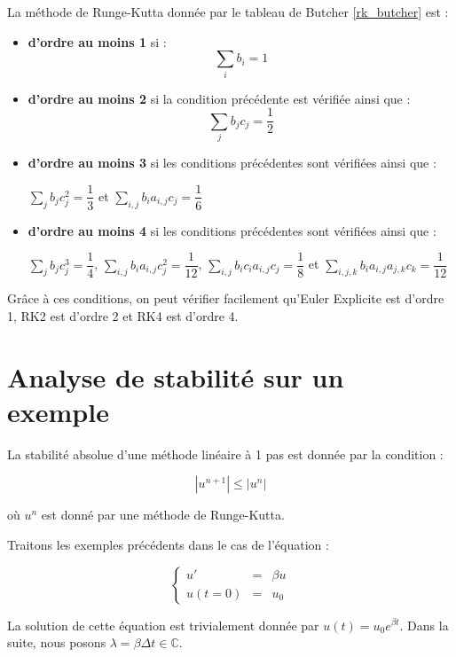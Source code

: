 \documentclass[10pt,a4paper]{amsart}
\begin{document}
La méthode de Runge-Kutta donnée par le tableau de Butcher \ref{rk_butcher} est  :

\begin{itemize}
\item \textbf{d'ordre au moins 1} si :
$$\sum_{i} b_i = 1$$
\item \textbf{d'ordre au moins 2} si la condition précédente est vérifiée ainsi que :
$$\sum_{j} b_j c_j = \dfrac{1}{2}$$
\item \textbf{d'ordre au moins 3} si les conditions précédentes sont vérifiées ainsi que :
\begin{center}
$\sum_j b_j c_j^2 = \dfrac{1}{3}$ et $\sum_{i,j} b_i a_{i,j} c_j = \dfrac{1}{6}$
\end{center}
\item \textbf{d'ordre au moins 4} si les conditions précédentes sont vérifiées ainsi que :
\begin{center}
$\sum_j b_j c_j^3 = \dfrac{1}{4}$, $\sum_{i,j} b_i a_{i,j} c_j^2 = \dfrac{1}{12}$, $\sum_{i,j} b_i c_i a_{i,j} c_j = \dfrac{1}{8}$ et $\sum_{i,j,k} b_i a_{i,j} a_{j,k} c_k = \dfrac{1}{12}$
\end{center}
\end{itemize}

Grâce à ces conditions, on peut vérifier facilement qu'Euler Explicite est d'ordre 1, RK2 est d'ordre 2 et RK4 est d'ordre 4.

\section{Analyse de stabilité sur un exemple}

La stabilité absolue d'une méthode linéaire à 1 pas est donnée par la condition :

\begin{equation}
|u^{n+1}| \leq |u^n|
\end{equation}

où $u^n$ est donné par une méthode de Runge-Kutta.

Traitons les exemples précédents dans le cas de l'équation :

\begin{equation}\label{EDO_simple}
\left\{
\begin{array}{rcl}
u' & = & \beta u \\
u(t=0) & = & u_0
\end{array}
\right.
\end{equation}

La solution de cette équation est trivialement donnée par $u(t)=u_0 e^{\beta t}$. Dans la suite, nous posons $\lambda = \beta \Delta t \in \mathbb{C} $.
\end{document}
